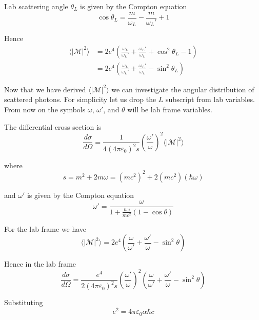 Lab scattering angle $\theta_L$ is given by the Compton equation
\begin{equation*}
\cos\theta_L=\frac{m}{\omega_L}-\frac{m}{\omega_L'}+1
\end{equation*}

Hence
\begin{align*}
\langle|\mathcal{M}|^2\rangle
&=2e^4\left(
\frac{\omega_L}{\omega_L'}+\frac{\omega_L'}{\omega_L}+\cos^2\theta_L-1
\right)
\\
&=2e^4\left(
\frac{\omega_L}{\omega_L'}+\frac{\omega_L'}{\omega_L}-\sin^2\theta_L
\right)
\end{align*}

Now that we have derived $\langle|\mathcal{M}|^2\rangle$
we can investigate the angular distribution of scattered photons.
For simplicity let us drop the $L$ subscript from lab variables.
From now on the symbols $\omega$, $\omega'$, and $\theta$ will be lab frame variables.

\bigskip
The differential cross section is
\begin{equation*}
\frac{d\sigma}{d\Omega}=\frac{1}{4(4\pi\varepsilon_0)^2s}
\left(\frac{\omega'}{\omega}\right)^2\langle|\mathcal{M}|^2\rangle
\end{equation*}

where
\begin{equation*}
s=m^2+2m\omega=(mc^2)^2+2(mc^2)(\hbar\omega)
\end{equation*}

and $\omega'$ is given by the Compton equation
\begin{equation*}
\omega'=\frac{\omega}{1+\frac{\hbar\omega}{mc^2}(1-\cos\theta)}
\end{equation*}

For the lab frame we have
\begin{equation*}
\langle|\mathcal{M}|^2\rangle
=2e^4\left(
\frac{\omega}{\omega'}+\frac{\omega'}{\omega}-\sin^2\theta
\right)
\end{equation*}

Hence in the lab frame
\begin{equation*}
\frac{d\sigma}{d\Omega}
=\frac{e^4}{2(4\pi\varepsilon_0)^2s}
\left(\frac{\omega'}{\omega}\right)^2
\left(
\frac{\omega}{\omega'}+\frac{\omega'}{\omega}-\sin^2\theta
\right)
\end{equation*}

Substituting
\begin{equation*}
e^2=4\pi\varepsilon_0\alpha\hbar c
\end{equation*}

